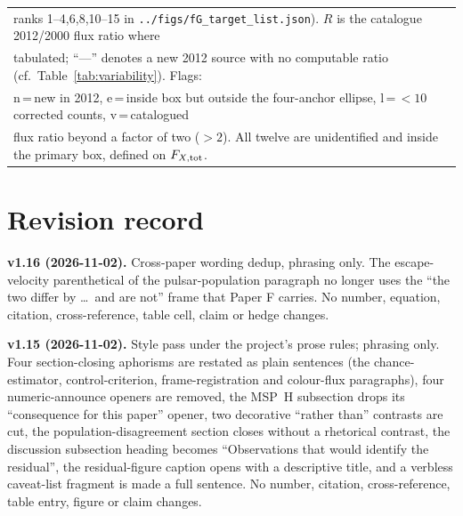 \documentclass[11pt]{article}
\begin{document}
\begin{table}[htbp]
\begin{tabular}{cllccrrrrrl}
\multicolumn{11}{l}{\footnotesize \phantom{Chart} ranks 1--4,6,8,10--15 in \texttt{../figs/fG\_target\_list.json}). $R$ is the catalogue 2012/2000 flux ratio where} \\
\multicolumn{11}{l}{\footnotesize \phantom{Chart} tabulated; ``---'' denotes a new 2012 source with no computable ratio (cf.\ Table~\ref{tab:variability}). Flags:} \\
\multicolumn{11}{l}{\footnotesize \phantom{Chart} n\,=\,new in 2012, e\,=\,inside box but outside the four-anchor ellipse, l\,=\,$<10$ corrected counts, v\,=\,catalogued} \\
\multicolumn{11}{l}{\footnotesize \phantom{Chart} flux ratio beyond a factor of two ($>2$). All twelve are unidentified and inside the primary box, defined on $F_{X,{\rm tot}}$.} \\
\end{tabular}
\end{table}


\section{Revision record}
\label{app:revisions}

\textbf{v1.16 (2026-11-02).} Cross-paper wording dedup, phrasing only. The escape-velocity parenthetical of the pulsar-population paragraph no longer uses the ``the two differ by \ldots\ and are not'' frame that Paper F carries. No number, equation, citation, cross-reference, table cell, claim or hedge changes.

\textbf{v1.15 (2026-11-02).} Style pass under the project's prose rules; phrasing only. Four section-closing aphorisms are restated as plain sentences (the chance-estimator, control-criterion, frame-registration and colour-flux paragraphs), four numeric-announce openers are removed, the MSP~H subsection drops its ``consequence for this paper'' opener, two decorative ``rather than'' contrasts are cut, the population-disagreement section closes without a rhetorical contrast, the discussion subsection heading becomes ``Observations that would identify the residual'', the residual-figure caption opens with a descriptive title, and a verbless caveat-list fragment is made a full sentence. No number, citation, cross-reference, table entry, figure or claim changes.
\end{document}
